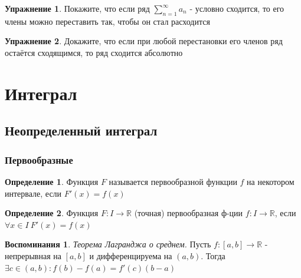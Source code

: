 \documentclass[a4paper]{article}
\theoremstyle{definition}
\newtheorem*{definition*}{Определение}
\newtheorem*{memories}{Воспоминания}
\newtheorem*{upr}{Упражнение}
\numberwithin{theorem}{subsection}
\numberwithin{lemma}{subsection}
\numberwithin{definition}{subsection}
\numberwithin{comment*}{subsection}
\numberwithin{consequence}{subsection}
\numberwithin{property}{subsection}
\begin{document}
\begin{upr}
 Покажите, что если ряд $\sum_{n=1}^{\infty}{a_n}$ - условно сходится, то его члены можно переставить так, чтобы он стал расходится
\end{upr}
\begin{upr}
 Докажите, что если при любой перестановки его членов ряд остаётся сходящимся, то ряд сходится абсолютно
\end{upr}

\section{Интеграл}

\subsection{Неопределенный интеграл}

\subsubsection{Первообразные}

\begin{definition*}
 Функция $F$ называется первообразной функции $f$ на некотором интервале, если $F'(x) = f(x)$
\end{definition*}

\begin{definition*}
 Функция $F: I \rightarrow \mathbb{R}$ (точная) первообразная ф-ции $f: I \rightarrow \mathbb{R}$, если $\forall{x} \in I \ F'(x) = f(x)$
\end{definition*}
\begin{memories}
 \textit{Теорема Лагранджа о среднем.}
 Пусть $f:[a,b]\rightarrow \mathbb{R}$ - непрерывная на $[a,b]$  и дифференцируема на $(a,b)$. Тогда $\exists{c}\in (a,b): f(b)-f(a)=f'(c)(b-a)$
\end{memories}
\end{document}
